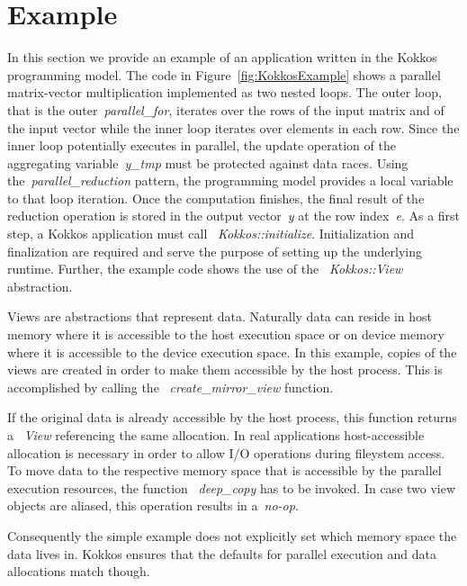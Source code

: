 \section{Example}\label{chap:kokkosExample}

In this section we provide an example of an application written in the Kokkos programming model. The code in Figure~\ref{fig:KokkosExample} shows a parallel matrix-vector multiplication implemented as two nested loops. The outer loop, that is the outer~\emph{parallel\_for}, iterates over the rows of the input matrix and of the input vector while the inner loop iterates over elements in each row. Since the inner loop potentially executes in parallel, the update operation of the aggregating variable~\emph{y\_tmp} must be protected against data races. Using the~\emph{parallel\_reduction} pattern, the programming model provides a local variable to that loop iteration. Once the computation finishes, the final result of the reduction operation is stored in the output vector~\emph{y} at the row index~\emph{e}.  
As a first step, a Kokkos application must call ~\emph{Kokkos::initialize}. Initialization and finalization are required and serve the purpose of setting up the underlying runtime. 
Further, the example code shows the use of the ~\emph{Kokkos::View} abstraction. 

Views are abstractions that represent data. Naturally data can reside in host memory where it is accessible to the host execution space or on device memory where it is accessible to the device execution space. In this example, copies of the views are created in order to make them accessible by the host process. This is accomplished by calling the ~\emph{create\_mirror\_view} function. 

If the original data is already accessible by the host process, this function returns a ~\emph{View} referencing the same allocation. In real applications host-accessible allocation is necessary in order to allow I/O operations during fileystem access. To move data to the respective memory space that is accessible by the parallel execution resources, the function ~\emph{deep\_copy} has to be invoked. In case two view objects are aliased, this operation results in a~\emph{no-op}. 

Consequently the simple example does not explicitly set which memory space the data lives in.
Kokkos ensures that the defaults for parallel execution and data allocations match though. 

